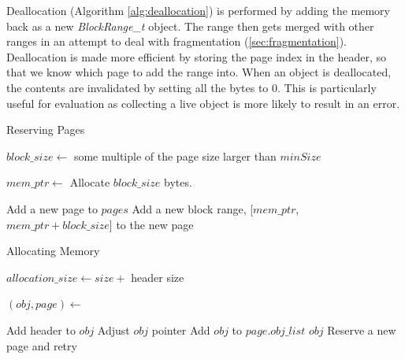 \documentclass[../diss.tex]{subfiles}
\begin{document}
Deallocation (Algorithm \ref{alg:deallocation}) is performed by adding the memory back as a new \emph{BlockRange\_t} object. The range then gets merged with other ranges in an attempt to deal with fragmentation (\cref{sec:fragmentation}). Deallocation is made more efficient by storing the page index in the header, so that we know which page to add the range into. When an object is deallocated, the contents are invalidated by setting all the bytes to 0. This is particularly useful for evaluation as collecting a live object is more likely to result in an error.

\begin{algorithm}
\caption{Reserving Pages}
\label{alg:reservepage}
\begin{algorithmic}


\State $block\_size\gets $ some multiple of the page size larger than $minSize$

\State $mem\_ptr\gets$ Allocate $block\_size$ bytes.
\State {}

\State Add a new page to $pages$
\State Add a new block range, [$mem\_ptr$, $mem\_ptr + block\_size$] to the new page

\EndFunction

\end{algorithmic}
\end{algorithm}

\begin{algorithm}
\caption{Allocating Memory}
\label{alg:allocation}
\begin{algorithmic}


\State $allocation\_size\gets size + $ header size

\State $(obj, page)\gets $ 

    \State Add header to $obj$
    \State Adjust $obj$ pointer
    \State Add $obj$ to $page.obj\_list$
    \State \Return $obj$
\Else
    \State Reserve a new page and retry
\EndIf

\EndFunction

\end{algorithmic}
\end{algorithm}
\end{document}
